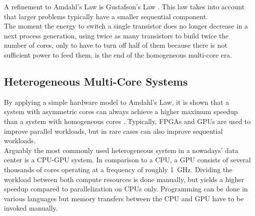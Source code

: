 
A refinement to Amdahl's Law is Gustafson's Law \cite{gustafson}. This law takes into account that larger problems typically have a smaller sequential component.\\
The moment the energy to switch a single transistor does no longer decrease in a next process generation, using twice as many transistors to build twice the number of cores, only to have to turn off half of them because there is not sufficient power to feed them, is the end of the homogeneous multi-core era.





\subsection{Heterogeneous Multi-Core Systems}
\label{sec:hetero}
By applying a simple hardware model to Amdahl's Law, it is shown that a system with asymmetric cores can always achieve a higher maximum speedup than a system with homogeneous cores \cite{amdahl-era}. 
Typically, FPGAs and GPUs are used to improve parallel workloads, but in rare cases can also improve sequential workloads.\\


Arguably the most commonly used heterogeneous system in a nowadays' data center is a CPU-GPU system. In comparison to a CPU, a GPU consists of several thousands of cores operating at a frequency of roughly \SI{1}{\giga\hertz}. Dividing the workload between both compute resources is done manually, but yields a higher speedup compared to parallelization on CPUs only. Programming can be done in various languages but memory transfers between the CPU and GPU have to be invoked manually.\\

